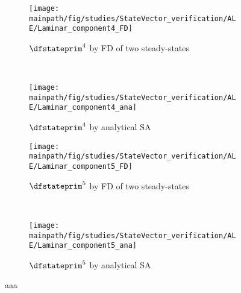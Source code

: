 \documentclass[../main.tex]{subfiles}
\begin{document}
\begin{figure}[t!]
   
    \begin{subfigure}[t]{0.5\textwidth}
        \centering
        \texttt{[image: \\mainpath/fig/studies/StateVector\_verification/ALE/Laminar\_component4\_FD]}
        \caption{$\dfstateprim^4$ by \ac{FD} of two steady-states}
    \end{subfigure}%
    ~ 
    \begin{subfigure}[t]{0.5\textwidth}
        \centering
        \texttt{[image: \\mainpath/fig/studies/StateVector\_verification/ALE/Laminar\_component4\_ana]}
        \caption{$\dfstateprim^4$ by analytical \ac{SA}}
    \end{subfigure}
    
    
    \begin{subfigure}[t]{0.5\textwidth}
        \centering
        \texttt{[image: \\mainpath/fig/studies/StateVector\_verification/ALE/Laminar\_component5\_FD]}
        \caption{$\dfstateprim^5$ by \ac{FD} of two steady-states}
    \end{subfigure}%
    ~ 
    \begin{subfigure}[t]{0.5\textwidth}
        \centering
        \texttt{[image: \\mainpath/fig/studies/StateVector\_verification/ALE/Laminar\_component5\_ana]}
        \caption{$\dfstateprim^5$ by analytical \ac{SA}}
    \end{subfigure}
    \caption[aaa]{aaa}
    \label{fig:dwds_verification_ale_euler}
    
\end{figure}
\end{document}
